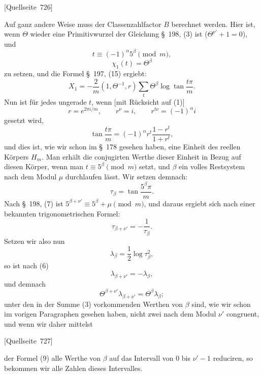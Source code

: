 \documentclass[11pt]{article}
\newcommand{\srcpage}[1]{\par\medskip\noindent\textsf{[Quellseite~#1]}\par\smallskip}
\begin{document}
\srcpage{726}
Auf ganz andere Weise muss der Classenzahlfactor $B$ berechnet werden. Hier ist, wenn $\Theta$ wieder eine Primitivwurzel der Gleichung \S~198, (3) ist ($\Theta^{\nu'}+1=0$), und
\begin{equation}
t\equiv(-1)^\alpha5^\beta\pmod m,
\tag{1}
\end{equation}
\begin{equation}
\chi_1(t)=\Theta^\beta
\tag{2}
\end{equation}
zu setzen, und die Formel \S~197, (15) ergiebt:
\begin{equation}
X_1=-\frac2m(1,\Theta^{-1},r)\sum_t\Theta^\beta\log\tan\frac{t\pi}{m}.
\tag{3}
\end{equation}
Nun ist für jedes ungerade $t$, wenn [mit Rücksicht auf (1)]
\[
r=e^{2\pi i/m},
\qquad
r^\nu=i,
\qquad
r^{t\nu}=(-1)^\alpha i
\]
gesetzt wird,
\begin{equation}
\tan\frac{t\pi}{m}=(-1)^\alpha r^t\frac{1-r^t}{1+r^t},
\tag{4}
\end{equation}
und dies ist, wie wir schon im \S~178 gesehen haben, eine Einheit des reellen Körpers $H_m$. Man erhält die conjugirten Werthe dieser Einheit in Bezug auf diesen Körper, wenn man $t\equiv5^\beta\pmod m$ setzt, und $\beta$ ein volles Restsystem nach dem Modul $\mu$ durchlaufen lässt. Wir setzen demnach:
\begin{equation}
\tau_\beta=\tan\frac{5^\beta\pi}{m}.
\tag{5}
\end{equation}
Nach \S~198, (7) ist $5^{\beta+\nu'}\equiv5^\beta+\mu\pmod m$, und daraus ergiebt sich nach einer bekannten trigonometrischen Formel:
\begin{equation}
\tau_{\beta+\nu'}=-\frac1{\tau_\beta}.
\tag{6}
\end{equation}
Setzen wir also nun
\begin{equation}
\lambda_\beta=\frac12\log\tau_\beta^2,
\tag{7}
\end{equation}
so ist nach (6)
\begin{equation}
\lambda_{\beta+\nu'}=-\lambda_\beta,
\tag{8}
\end{equation}
und demnach
\begin{equation}
\Theta^{\beta+\nu'}\lambda_{\beta+\nu'}=\Theta^\beta\lambda_\beta;
\tag{9}
\end{equation}
unter den in der Summe (3) vorkommenden Werthen von $\beta$ sind, wie wir schon im vorigen Paragraphen gesehen haben, nicht zwei nach dem Modul $\nu'$ congruent, und wenn wir daher mittelst
\srcpage{727}
der Formel (9) alle Werthe von $\beta$ auf das Intervall von 0 bis $\nu'-1$ reduciren, so bekommen wir alle Zahlen dieses Intervalles.
\end{document}
